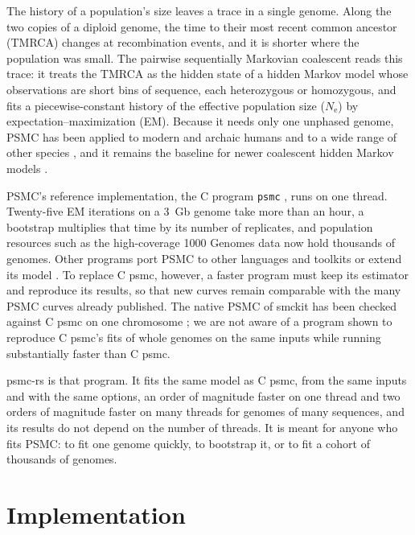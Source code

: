 \documentclass[a4paper,num-refs,gigabyte]{oup-contemporary}%
\newcommand{\psmcrs}{psmc-rs}
\newcommand{\Ne}{\ensuremath{N_\mathrm{e}}}
\begin{document}
The history of a population's size leaves a trace in a single genome. Along the two copies of a diploid genome, the time to their most recent common ancestor (TMRCA) changes at recombination events, and it is shorter where the population was small. The pairwise sequentially Markovian coalescent \citep[PSMC;][]{li2011} reads this trace: it treats the TMRCA as the hidden state of a hidden Markov model whose observations are short bins of sequence, each heterozygous or homozygous, and fits a piecewise-constant history of the effective population size (\Ne) by expectation--maximization (EM). Because it needs only one unphased genome, PSMC has been applied to modern and archaic humans \citep{li2011,prufer2014,mallick2016} and to a wide range of other species \citep{nadachowska2016,hilgers2025}, and it remains the baseline for newer coalescent hidden Markov models \citep{schiffels2014,terhorst2017,cousins2025,terhorst2025}.

PSMC's reference implementation, the C program \texttt{psmc} \citep{psmcC}, runs on one thread. Twenty-five EM iterations on a 3~Gb genome take more than an hour, a bootstrap multiplies that time by its number of replicates, and population resources such as the high-coverage 1000 Genomes data \citep{byrskabishop2022} now hold thousands of genomes. Other programs port PSMC to other languages and toolkits \citep{psmcr,psmcpython,smckit} or extend its model \citep{schiffels2020,liu2022,cousins2024,cousins2025}. To replace C psmc, however, a faster program must keep its estimator and reproduce its results, so that new curves remain comparable with the many PSMC curves already published. The native PSMC of smckit has been checked against C psmc on one chromosome \citep{smckit}; we are not aware of a program shown to reproduce C psmc's fits of whole genomes on the same inputs while running substantially faster than C psmc.

\psmcrs{} is that program. It fits the same model as C psmc, from the same inputs and with the same options, an order of magnitude faster on one thread and two orders of magnitude faster on many threads for genomes of many sequences, and its results do not depend on the number of threads. It is meant for anyone who fits PSMC: to fit one genome quickly, to bootstrap it, or to fit a cohort of thousands of genomes.

\section{Implementation}
\end{document}
